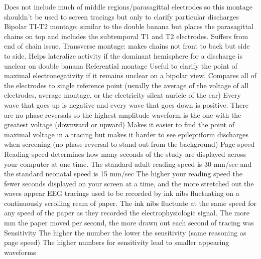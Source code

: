 \documentclass{article}
\begin{document}
Does not include much of middle regions/parasagittal electrodes so this montage shouldn’t be used to screen tracings but only to clarify particular discharges 
Bipolar TI-T2 montage: similar to the double banana but places the parasagittal chains on top and includes the subtemporal T1 and T2 electrodes. Suffers from end of chain issue.
Transverse montage: makes chains not front to back but side to side. Helps lateralize activity if the dominant hemisphere for a discharge is unclear on double banana
Referential montage 
Useful to clarify the point of maximal electronegativity if it remains unclear on a bipolar view.
Compares all of the electrodes to single reference point (usually the average of the voltage of all electrodes, average montage, or the electricity silent auricle of the ear)
Every wave that goes up is negative and every wave that goes down is positive. 
There are no phase reversals so the highest amplitude waveform is the one with the greatest voltage (downward or upward)
Makes it easier to find the point of maximal voltage in a tracing but makes it harder to see epileptiform discharges when screening (no phase reversal to stand out from the background)
Page speed
Reading speed determines how many seconds of the study are displayed across your computer at one time. 
The standard adult reading speed is 30 mm/sec and the standard neonatal speed is 15 mm/sec
The higher your reading speed the fewer seconds displayed on your screen at a time, and the more stretched out the waves appear
EEG tracings used to be recorded by ink nibs fluctuating on a continuously scrolling ream of paper. 
The ink nibs fluctuate at the same speed for any speed of the paper as they recorded the electrophysiologic signal.
The more mm the paper moved per second, the more drawn out each second of tracing was
Sensitivity 
The higher the number the lower the sensitivity (same reasoning as page speed)
The higher numbers for sensitivity lead to smaller appearing waveforms
\end{document}
